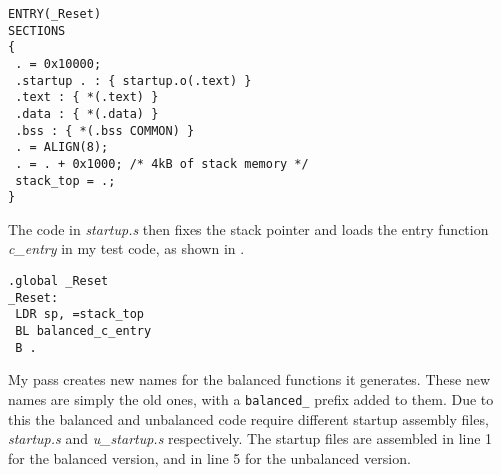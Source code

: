 \begin{lstlisting}[caption=Memory map in \emph{startup.ld}, label=lst:mmap]
ENTRY(_Reset)
SECTIONS
{
 . = 0x10000;
 .startup . : { startup.o(.text) }
 .text : { *(.text) }
 .data : { *(.data) }
 .bss : { *(.bss COMMON) }
 . = ALIGN(8);
 . = . + 0x1000; /* 4kB of stack memory */
 stack_top = .;
}
\end{lstlisting}

The code in \emph{startup.s} then fixes the stack pointer and loads the entry function \emph{c\_entry} in my test code, as shown in .

\begin{lstlisting}[caption=Startup assembly code, label=lst:startup]
.global _Reset
_Reset:
 LDR sp, =stack_top
 BL balanced_c_entry
 B .
\end{lstlisting}

My pass creates new names for the balanced functions it generates.
These new names are simply the old ones, with a \texttt{balanced\_} prefix added to them.
Due to this the balanced and unbalanced code require different startup assembly files, \emph{startup.s} and \emph{u\_startup.s} respectively.
The startup files are assembled in line 1 for the balanced version, and in line 5 for the unbalanced version.
